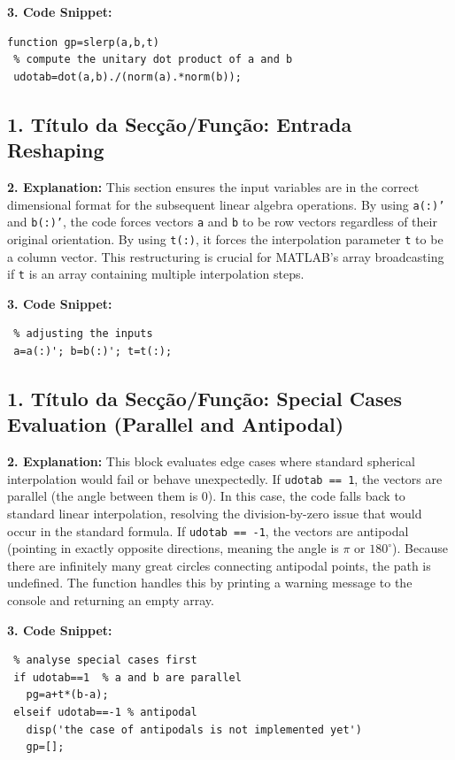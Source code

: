 \textbf{3. Code Snippet:}
\begin{lstlisting}
function gp=slerp(a,b,t)
 % compute the unitary dot product of a and b
 udotab=dot(a,b)./(norm(a).*norm(b));
\end{lstlisting}


\subsection*{1. Título da Secção/Função: Entrada Reshaping}
\textbf{2. Explanation:} This section ensures the input variables are in the correct dimensional format for the subsequent linear algebra operations. By using \texttt{a(:)'} and \texttt{b(:)'}, the code forces vectors \texttt{a} and \texttt{b} to be row vectors regardless of their original orientation. By using \texttt{t(:)}, it forces the interpolation parameter \texttt{t} to be a column vector. This restructuring is crucial for MATLAB's array broadcasting if \texttt{t} is an array containing multiple interpolation steps.

\textbf{3. Code Snippet:}
\begin{lstlisting}
 % adjusting the inputs
 a=a(:)'; b=b(:)'; t=t(:);
\end{lstlisting}


\subsection*{1. Título da Secção/Função: Special Cases Evaluation (Parallel and Antipodal)}
\textbf{2. Explanation:} This block evaluates edge cases where standard spherical interpolation would fail or behave unexpectedly. 
If \texttt{udotab == 1}, the vectors are parallel (the angle between them is $0$). In this case, the code falls back to standard linear interpolation, resolving the division-by-zero issue that would occur in the standard formula. 
If \texttt{udotab == -1}, the vectors are antipodal (pointing in exactly opposite directions, meaning the angle is $\pi$ or $180^\circ$). Because there are infinitely many great circles connecting antipodal points, the path is undefined. The function handles this by printing a warning message to the console and returning an empty array.

\textbf{3. Code Snippet:}
\begin{lstlisting}
 % analyse special cases first
 if udotab==1  % a and b are parallel
   pg=a+t*(b-a);
 elseif udotab==-1 % antipodal
   disp('the case of antipodals is not implemented yet')
   gp=[];
\end{lstlisting}


